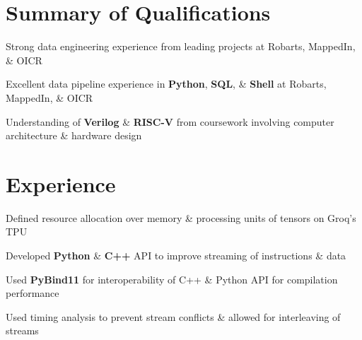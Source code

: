 \documentclass[]{chandan-cv}
\begin{document}
\hfill
\begin{minipage}[t]{0.75\textwidth}


\section{Summary of Qualifications}
\runsubsection{ }
\descript{ }
\location{ }
\vspace{\topsep} %
\begin{tightemize}
	\item Strong data engineering experience from leading projects at Robarts, MappedIn, \& OICR
	\item Excellent data pipeline experience in \textbf{Python}, \textbf{SQL}, \& \textbf{Shell} at Robarts, MappedIn, \& OICR 
	\item Understanding of \textbf{Verilog} \& \textbf{RISC-V} from coursework involving 
	computer architecture \& hardware design
\end{tightemize}
\sectionsep


\section{Experience}

\begin{tightemize}
        \item Defined resource allocation over memory \& processing units of tensors on Groq's TPU
        \item Developed \textbf{Python} \& \textbf{C++} API to improve streaming of instructions \& data
        \item Used \textbf{PyBind11} for interoperability of C++ \& Python API for compilation performance 
        \item Used timing analysis to prevent stream conflicts \& allowed for interleaving of streams
\end{tightemize}
\sectionsep


\end{minipage}
\end{document}
